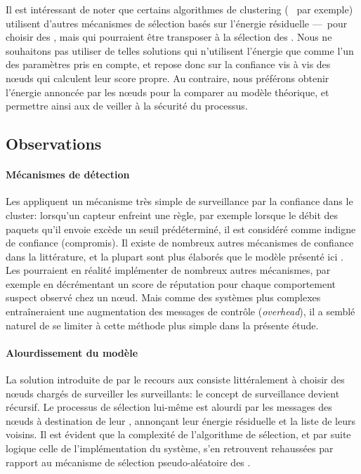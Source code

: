 Il est intéressant de noter que certains algorithmes de clustering (\heed~\cite{YF04} par exemple) utilisent d'autres mécanismes de sélection basés sur l'énergie résiduelle ---~pour choisir des \chs, mais qui pourraient être transposer à la sélection des \cns.
Nous ne souhaitons pas utiliser de telles solutions qui n'utilisent l'énergie que comme l'un des paramètres pris en compte, et repose donc sur la confiance vis à vis des nœuds qui calculent leur score propre.
Au contraire, nous préférons obtenir l'énergie annoncée par les nœuds pour la comparer au modèle théorique, et permettre ainsi aux \vns de veiller à la sécurité du processus.

    \subsection{Observations}

\paragraph{Mécanismes de détection}
Les \cns appliquent un mécanisme très simple de surveillance par la confiance dans le cluster: lorsqu'un capteur enfreint une règle, par exemple lorsque le débit des paquets qu'il envoie excède un seuil prédéterminé, il est considéré comme indigne de confiance (compromis).
Il existe de nombreux autres mécanismes de confiance dans la littérature, et la plupart sont plus élaborés que le modèle présenté ici .
Les \cns pourraient en réalité implémenter de nombreux autres mécanismes, par exemple en décrémentant un score de réputation pour chaque comportement suspect observé chez un nœud.
Mais comme des systèmes plus complexes entraîneraient une augmentation des messages de contrôle (\textit{overhead}), il a semblé naturel de se limiter à cette méthode plus simple dans la présente étude.

\paragraph{Alourdissement du modèle}
La solution introduite de par le recours aux \vns consiste littéralement à choisir des nœuds chargés de surveiller les surveillants: le concept de surveillance devient récursif.
Le processus de sélection lui-même est alourdi par les messages des nœuds à destination de leur \ch, annonçant leur énergie résiduelle et la liste de leurs voisins.
Il est évident que la complexité de l'algorithme de sélection, et par suite logique celle de l'implémentation du système, s'en retrouvent rehaussées par rapport au mécanisme de sélection pseudo-aléatoire des \cns.

